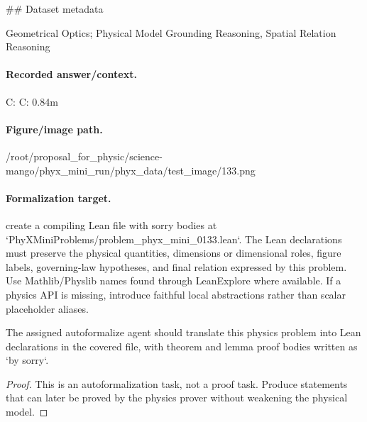 \#\# Dataset metadata

Geometrical Optics; Physical Model Grounding Reasoning, Spatial Relation Reasoning

\paragraph{Recorded answer/context.}
C: C: 0.84m

\paragraph{Figure/image path.}
/root/proposal\_for\_physic/science-mango/phyx\_mini\_run/phyx\_data/test\_image/133.png

\paragraph{Formalization target.}
create a compiling Lean file with sorry bodies at `PhyXMiniProblems/problem\_phyx\_mini\_0133.lean`. The Lean declarations must preserve the physical quantities, dimensions or dimensional roles, figure labels, governing-law hypotheses, and final relation expressed by this problem.
Use Mathlib/Physlib names found through LeanExplore where available. If a physics API is missing, introduce faithful local abstractions rather than scalar placeholder aliases.

\begin{theorem}
\label{thm:physics:phyx_mini_0133:target}
The assigned autoformalize agent should translate this physics problem into Lean declarations in the covered file, with theorem and lemma proof bodies written as `by sorry`.
\end{theorem}
\begin{proof}
This is an autoformalization task, not a proof task. Produce statements that can later be proved by the physics prover without weakening the physical model.
\end{proof}

